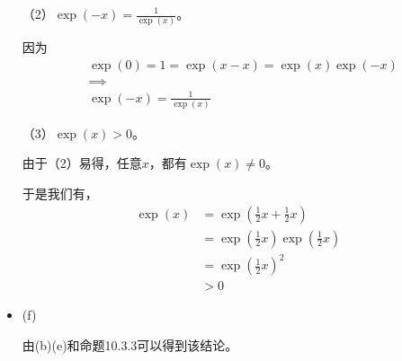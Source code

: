 \documentclass{article}
\begin{document}
\begin{itemize}
        （2）$\exp(-x) = \frac{1}{\exp(x)}$。

        因为
        \begin{align*}
           & \exp(0) = 1 = \exp(x - x) = \exp(x)\exp(-x) \\
           & \implies                                    \\
           & \exp(-x) = \frac{1}{\exp(x)}
        \end{align*}

        （3）$\exp(x) > 0$。

        由于（2）易得，任意$x$，都有$\exp(x) \neq 0$。

        于是我们有，
        \begin{align*}
          \exp(x) & = \exp(\frac{1}{2}x + \frac{1}{2}x )   \\
                  & = \exp(\frac{1}{2}x)\exp(\frac{1}{2}x) \\
                  & = \exp(\frac{1}{2}x)^2                 \\
                  & > 0
        \end{align*}

  \item (f)

        由(b)(e)和命题10.3.3可以得到该结论。

\end{itemize}
\end{document}
